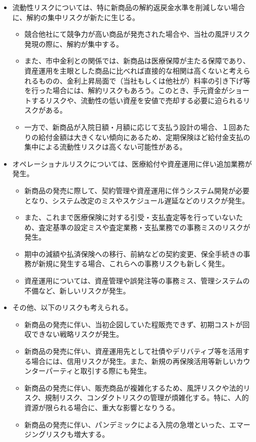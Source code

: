 \documentclass[report,gutter=10mm,fore-edge=10mm,uplatex,dvipdfmx]{jlreq}
\begin{document}
\begin{itemize}
\begin{itemize}
\end{itemize}
\item[]  流動性リスクについては、特に新商品の解約返戻金水準を削減しない場合に、解約の集中リスクが新たに生じる。
\begin{itemize}
\item[] 競合他社にて競争力が高い商品が発売された場合や、当社の風評リスク発現の際に、解約が集中する。
\item[] また、市中金利との関係では、新商品は医療保障が主たる保障であり、資産運用を主眼とした商品に比べれば直接的な相関は高くないと考えられるものの、金利上昇局面で（当社もしくは他社が）料率の引き下げ等を行った場合には、解約リスクもあろう。このとき、手元資金がショートするリスクや、流動性の低い資産を安値で売却する必要に迫られるリスクがある。
\item[] 一方で、新商品が入院日額・月額に応じて支払う設計の場合、１回あたりの給付金額は大きくない傾向にあるため、定期保険ほど給付金支払の集中による流動性リスクは高くない可能性がある。
\end{itemize}
\item[]  オペレーショナルリスクについては、医療給付や資産運用に伴い追加業務が発生。
\begin{itemize}
\item[] 新商品の発売に際して、契約管理や資産運用に伴うシステム開発が必要となり、システム改定のミスやスケジュール遅延などのリスクが発生。\
\item[]また、これまで医療保険に対する引受・支払査定等を行っていないため、査定基準の設定ミスや査定業務・支払業務での事務ミスのリスクが発生。
\item[ ]期中の減額や払済保険への移行、前納などの契約変更、保全手続きの事務が新規に発生する場合、これらへの事務リスクも新しく発生。
\item[ ]資産運用については、資産管理や誤発注等の事務ミス、管理システムの不備など、新しいリスクが発生。
\end{itemize}
\item[]  その他、以下のリスクも考えられる。
\begin{itemize}
\item[] 新商品の発売に伴い、当初企図していた程販売できず、初期コストが回収できない戦略リスクが発生。
\item[] 新商品の発売に伴い、資産運用先として社債やデリバティブ等を活用する場合には、信用リスクが発生。また、新規の再保険活用等新しいカウンターパーティと取引する際にも発生。
\item[] 新商品の発売に伴い、販売商品が複雑化するため、風評リスクや法的リスク、規制リスク、コンダクトリスクの管理が煩雑化する。特に、人的資源が限られる場合に、重大な影響となりうる。
\item[] 新商品の発売に伴い、パンデミックによる入院の急増といった、エマージングリスクも増大する。
\end{itemize}
\end{itemize}
\end{document}
